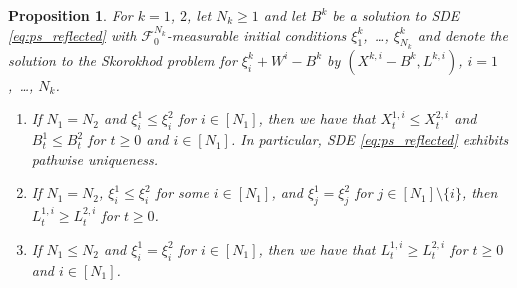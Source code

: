 \documentclass[11pt, a4paper]{article}
\theoremstyle{plain}
\newtheorem{proposition}[theorem]{Proposition}
\theoremstyle{definition}
\theoremstyle{remark}
\numberwithin{equation}{section}
\newcommand{\F}{\mathcal{F}}
\begin{document}
\begin{proposition} \label{prop:comparison}
For $k = 1$, $2$, let $N_k \geq 1$ and let $B^k$ be a solution to SDE \eqref{eq:ps_reflected} with $\F^{N_k}_0$-measurable initial conditions $\xi^k_1$,~\ldots, $\xi^k_{N_k}$ and denote the solution to the Skorokhod problem for $\xi^k_i + W^i - B^k$ by $(X^{k, i} - B^k, L^{k, i})$, $i = 1$,~\ldots, $N_k$. 
\begin{enumerate}[noitemsep, label = (\roman*)]
    \item \label{it:comparison} If $N_1 = N_2$ and $\xi^1_i \leq \xi^2_i$ for $i \in [N_1]$, then we have that $X^{1, i}_t \leq X^{2, i}_t$ and $B^1_t \leq B^2_t$ for $t \geq 0$ and $i \in [N_1]$. In particular, SDE \eqref{eq:ps_reflected} exhibits pathwise uniqueness.
    \item \label{it:comparison_local} If $N_1 = N_2$, $\xi^1_i \leq \xi^2_i$ for some $i \in [N_1]$, and $\xi^1_j = \xi^2_j$ for $j \in [N_1] \setminus \{i\}$, then $L^{1, i}_t \geq L^{2, i}_t$ for $t \geq 0$.
    \item \label{it:comparison_number} If $N_1 \leq N_2$ and $\xi^1_i = \xi^2_i$ for $i \in [N_1]$, then we have that $L^{1, i}_t \geq L^{2, i}_t$ for $t \geq 0$ and  $i \in [N_1]$.
\end{enumerate}
\end{proposition}
\end{document}
